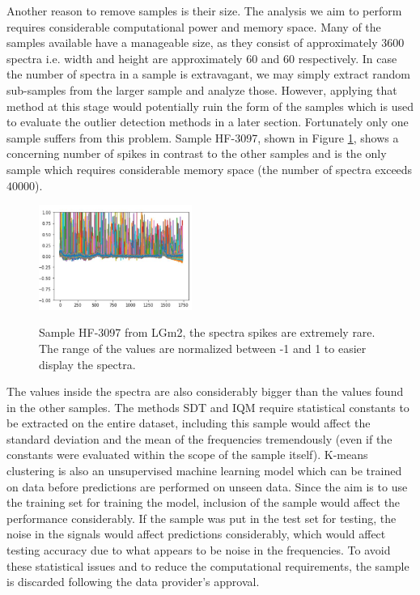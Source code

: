 Another reason to remove samples is their size. The analysis we aim to perform requires considerable computational power and memory space. Many of the samples available have a manageable size, as they consist of approximately $3600$ spectra i.e. width and height are approximately $60$ and $60$ respectively. In case the number of spectra in a sample is extravagant, we may simply extract random sub-samples from the larger sample and analyze those. However, applying that method at this stage would potentially ruin the form of the samples which is used to evaluate the outlier detection methods in a later section. Fortunately only one sample suffers from this problem. Sample HF-3097, shown in Figure \ref{fig:HF3097}, shows a concerning number of spikes in contrast to the other samples and is the only sample which requires considerable memory space (the number of spectra exceeds $40000$).

\begin{figure}[H]

    \centering
{\includegraphics[width=5cm]{images/HF_3097.JPG} }
\caption{Sample HF-3097 from LGm2, the spectra spikes are extremely rare. The range of the values are normalized between -1 and 1 to easier display the spectra.\label{fig:HF3097}}%

\end{figure}

The values inside the spectra are also considerably bigger than the values found in the other samples. The methods SDT and IQM require statistical constants to be extracted on the entire dataset, including this sample would affect the standard deviation and the mean of the frequencies tremendously (even if the constants were evaluated within the scope of the sample itself). K-means clustering is also an unsupervised machine learning model which can be trained on data before predictions are performed on unseen data. Since the aim is to use the training set for training the model, inclusion of the sample would affect the performance considerably. If the sample was put in the test set for testing, the noise in the signals would affect predictions considerably, which would affect testing accuracy due to what appears to be noise in the frequencies. To avoid these statistical issues and to reduce the computational requirements, the sample is discarded following the data provider's approval.


